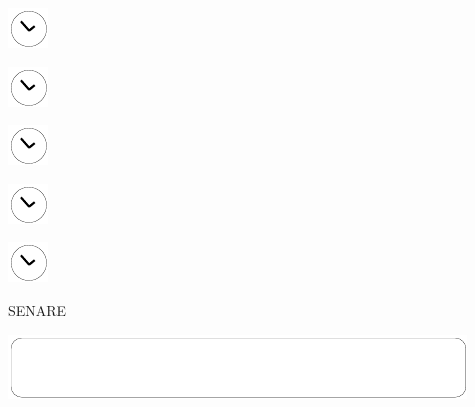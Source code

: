 \documentclass[11pt,titlepage]{article}
\begin{document}
\vspace{10,5mm}

\noindent
\hspace{1mm}\includegraphics[]{clockface.pdf}

\vspace{10,5mm}

\noindent
\hspace{1mm}\includegraphics[]{clockface.pdf}

\vspace{10,5mm}

\noindent
\hspace{1mm}\includegraphics[]{clockface.pdf}

\vspace{10,5mm}

\noindent
\hspace{1mm}\includegraphics[]{clockface.pdf}

\vspace{10,5mm}

\noindent
\hspace{1mm}\includegraphics[]{clockface.pdf}

\pagebreak

\small
\hfill SENARE

\vspace{6mm}

\noindent
\includegraphics[]{mediumbox.pdf}

\vspace{15mm}
\end{document}
